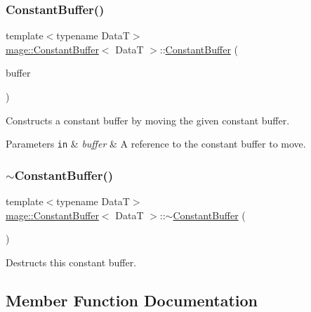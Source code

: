 \subsubsection{\texorpdfstring{Constant\+Buffer()}{ConstantBuffer()}\hspace{0.1cm}{\footnotesize\ttfamily [4/4]}}
{\footnotesize\ttfamily template$<$typename DataT$>$ \\
\hyperlink{structmage_1_1_constant_buffer}{mage\+::\+Constant\+Buffer}$<$ DataT $>$\+::\hyperlink{structmage_1_1_constant_buffer}{Constant\+Buffer} (\begin{DoxyParamCaption}\item[{\hyperlink{structmage_1_1_constant_buffer}{Constant\+Buffer}$<$ DataT $>$ \&\&}]{buffer }\end{DoxyParamCaption})\hspace{0.3cm}{\ttfamily [default]}}

Constructs a constant buffer by moving the given constant buffer.


\begin{DoxyParams}[1]{Parameters}
\mbox{\tt in}  & {\em buffer} & A reference to the constant buffer to move. \\
\hline
\end{DoxyParams}
\hypertarget{structmage_1_1_constant_buffer_a874e9507ea3b6d2f630f061c2fc6d2d0}{}\label{structmage_1_1_constant_buffer_a874e9507ea3b6d2f630f061c2fc6d2d0} 
\subsubsection{\texorpdfstring{$\sim$\+Constant\+Buffer()}{~ConstantBuffer()}}
{\footnotesize\ttfamily template$<$typename DataT$>$ \\
\hyperlink{structmage_1_1_constant_buffer}{mage\+::\+Constant\+Buffer}$<$ DataT $>$\+::$\sim$\hyperlink{structmage_1_1_constant_buffer}{Constant\+Buffer} (\begin{DoxyParamCaption}{ }\end{DoxyParamCaption})\hspace{0.3cm}{\ttfamily [default]}}

Destructs this constant buffer. 

\subsection{Member Function Documentation}
\hypertarget{structmage_1_1_constant_buffer_ad091e8de90f391fedaf6f8bbe39eeebb}{}\label{structmage_1_1_constant_buffer_ad091e8de90f391fedaf6f8bbe39eeebb} 
